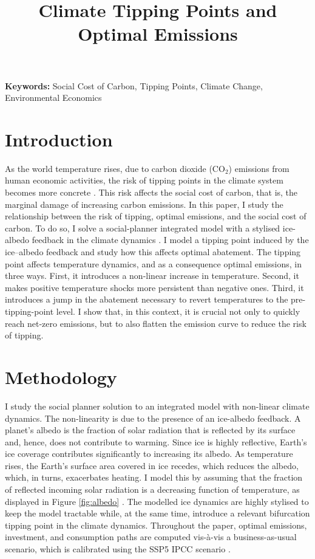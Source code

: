 \documentclass[12pt]{article}
\title{Climate Tipping Points and Optimal Emissions}
\author{} %
\date{} %
\begin{document}
\maketitle

\textbf{Keywords:} Social Cost of Carbon, Tipping Points, Climate Change, Environmental Economics

\section{Introduction}

As the world temperature rises, due to carbon dioxide (CO$_2$) emissions from human economic activities, the risk of tipping points in the climate system becomes more concrete \citep{ashwin_extreme_2020,sledd_cloudier_2021}. This risk affects the social cost of carbon, that is, the marginal damage of increasing carbon emissions. In this paper, I study the relationship between the risk of tipping, optimal emissions, and the social cost of carbon. To do so, I solve a social-planner integrated model with a stylised ice-albedo feedback in the climate dynamics \citep{hogg_glacial_2008,ashwin_tipping_2012}. I model a tipping point induced by the ice–albedo feedback and study how this affects optimal abatement. The tipping point affects temperature dynamics, and as a consequence optimal emissions, in three ways. First, it introduces a non-linear increase in temperature. Second, it makes positive temperature shocks more persistent than negative ones. Third, it introduces a jump in the abatement necessary to revert temperatures to the pre-tipping-point level. I show that, in this context, it is crucial not only to quickly reach net-zero emissions, but to also flatten the emission curve to reduce the risk of tipping.

\section{Methodology}

I study the social planner solution to an integrated model with non-linear climate dynamics. The non-linearity is due to the presence of an ice-albedo feedback. A planet's albedo is the fraction of solar radiation that is reflected by its surface and, hence, does not contribute to warming. Since ice is highly reflective, Earth's ice coverage contributes significantly to increasing its albedo. As temperature rises, the Earth's surface area covered in ice recedes, which reduces the albedo, which, in turns, exacerbates heating. I model this by assuming that the fraction of reflected incoming solar radiation is a decreasing function of temperature, as displayed in Figure \ref{fig:albedo} \citep{oerlemans_ice_1984, mendez_investigating_2021}. The modelled ice dynamics are highly stylised to keep the model tractable while, at the same time, introduce a relevant bifurcation tipping point in the climate dynamics. Throughout the paper, optimal emissions, investment, and consumption paths are computed vis-à-vis a business-as-usual scenario, which is calibrated using the SSP5 IPCC scenario \citep{kriegler_fossil-fueled_2017}.
\end{document}
